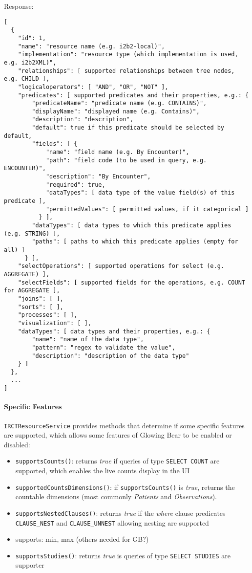 Response:
\begin{verbatim}
[
  {
    "id": 1,
    "name": "resource name (e.g. i2b2-local)",
    "implementation": "resource type (which implementation is used, e.g. i2b2XML)",
    "relationships": [ supported relationships between tree nodes, e.g. CHILD ],
    "logicaloperators": [ "AND", "OR", "NOT" ],
    "predicates": [ supported predicates and their properties, e.g.: {
        "predicateName": "predicate name (e.g. CONTAINS)",
        "displayName": "displayed name (e.g. Contains)",
        "description": "description",
        "default": true if this predicate should be selected by default,
        "fields": [ {
            "name": "field name (e.g. By Encounter)",
            "path": "field code (to be used in query, e.g. ENCOUNTER)",
            "description": "By Encounter",
            "required": true,
            "dataTypes": [ data type of the value field(s) of this predicate ],
            "permittedValues": [ permitted values, if it categorical ]
          } ],
        "dataTypes": [ data types to which this predicate applies (e.g. STRING) ],
        "paths": [ paths to which this predicate applies (empty for all) ]
      } ],
    "selectOperations": [ supported operations for select (e.g. AGGREGATE) ],
    "selectFields": [ supported fields for the operations, e.g. COUNT for AGGREGATE ],
    "joins": [ ],
    "sorts": [ ],
    "processes": [ ],
    "visualization": [ ],
    "dataTypes": [ data types and their properties, e.g.: {
        "name": "name of the data type",
        "pattern": "regex to validate the value",
        "description": "description of the data type"
    } ]
  },
  ...
]
\end{verbatim}


\paragraph{Specific Features}
\verb|IRCTResourceService| provides methods that determine if some specific features are supported, which allows some features of Glowing Bear to be enabled or disabled:
\begin{itemize}
    \item \verb|supportsCounts()|: returns \emph{true} if queries of type \verb|SELECT COUNT| are supported, which enables the live counts display in the UI
    \item \verb|supportedCountsDimensions()|: if \verb|supportsCounts()| is \emph{true}, returns the countable dimensions (most commonly \emph{Patients} and \emph{Observations}).
    \item \verb|supportsNestedClauses()|: returns \emph{true} if the \emph{where} clause predicates \verb|CLAUSE_NEST| and \verb|CLAUSE_UNNEST| allowing nesting are supported
    \item \verb|| supports: min, max (others needed for GB?)
    \item \verb|supportsStudies()|: returns \emph{true} is queries of type \verb|SELECT STUDIES| are supporter
\end{itemize}

